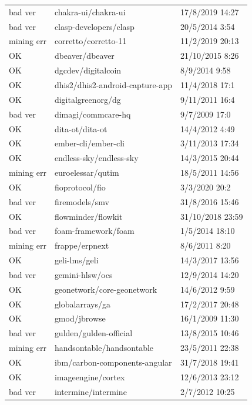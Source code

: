 \begin{appendices}
\begin{center}
\begin{longtable}{|l|l|l|}
            bad ver & chakra-ui/chakra-ui & 17/8/2019 14:27 \\
            bad ver & clasp-developers/clasp & 20/5/2014 3:54 \\
            mining err & corretto/corretto-11 & 11/2/2019 20:13 \\
            OK & dbeaver/dbeaver & 21/10/2015 8:26 \\
            OK & dgcdev/digitalcoin & 8/9/2014 9:58 \\
            OK & dhis2/dhis2-android-capture-app & 11/4/2018 17:1 \\
            OK & digitalgreenorg/dg & 9/11/2011 16:4 \\
            bad ver & dimagi/commcare-hq & 9/7/2009 17:0 \\
            OK & dita-ot/dita-ot & 14/4/2012 4:49 \\
            OK & ember-cli/ember-cli & 3/11/2013 17:34 \\
            OK & endless-sky/endless-sky & 14/3/2015 20:44 \\
            mining err & euroelessar/qutim & 18/5/2011 14:56 \\
            OK & fioprotocol/fio & 3/3/2020 20:2 \\
            bad ver & firemodels/smv & 31/8/2016 15:46 \\
            OK & flowminder/flowkit & 31/10/2018 23:59 \\
            bad ver & foam-framework/foam & 1/5/2014 18:10 \\
            mining err & frappe/erpnext & 8/6/2011 8:20 \\
            OK & geli-lms/geli & 14/3/2017 13:56 \\
            bad ver & gemini-hlsw/ocs & 12/9/2014 14:20 \\
            OK & geonetwork/core-geonetwork & 14/6/2012 9:59 \\
            OK & globalarrays/ga & 17/2/2017 20:48 \\
            OK & gmod/jbrowse & 16/1/2009 11:30 \\
            bad ver & gulden/gulden-official & 13/8/2015 10:46 \\
            mining err & handsontable/handsontable & 23/5/2011 22:38 \\
            OK & ibm/carbon-components-angular & 31/7/2018 19:41 \\
            OK & imageengine/cortex & 12/6/2013 23:12 \\
            bad ver & intermine/intermine & 2/7/2012 10:25 \\

\end{longtable}
\end{center}
\end{appendices}

